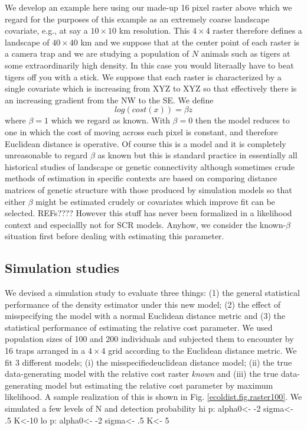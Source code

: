 We develop an example here using our made-up 16 pixel raster above which 
we regard for the purposes of this example as an extremely coarse landscape 
covariate, e.g., at say a $10 \times 10$ km resolution. This $4 \times  4$ raster therefore 
defines a landscape of $40 \times 40$ km and we suppose that at the center point 
of each raster is a camera trap and we are studying a population of $N$ 
animals such as tigers at some extraordinarily high density. In this case you
would literaally have to beat tigers off you with a stick. We suppose 
that each raster is characterized by a single covariate which is increasing 
from XYZ to XYZ so that effectively there is an increasing gradient from the 
NW to the SE. We define 
\[
 log(cost(x))=  \beta z 
 \]
where $\beta = 1$ which we regard as known. With $\beta=0$ then the model reduces to
one in which the cost of moving across each pixel is constant, and therefore Euclidean
distance is operative.
 Of course this is a model and it is completely
unreasonable to regard $\beta$ as known but this is standard practice in essentially all
historical studies of landscape or genetic connectivity although sometimes crude methods
of estimation in specific contexts are based on comparing distance matrices of genetic
structure with those produced by simulation models so that either $\beta$ might be estimated
crudely or covariates which improve fit can be selected. REFs????
However this stuff has never been formalized in a likelihood context and especiallly
not for SCR models. 
Anyhow, we consider the known-$\beta$ situation first before dealing with estimating
this parameter. 


\subsection{Simulation studies}

We devised a simulation study to evaluate three things: (1) the general statistical performance
of the density estimator under this new model; (2) the effect of misspecifying the model with
a normal Euclidean distance metric and (3) the statistical performance of estimating the relative
cost parameter.
We used population sizes of 100 and 200 individuals and subjected them to encounter by 16 traps
arranged in a $4\times 4$ grid according to the Euclidean distance metric. We fit 3 different 
models; (i) the misspecifiedeuclidean distance model; (ii) the true data-generating model with
the relative cost raster {\it known} and (iii) the true data-generating model but estimating
the relative cost parameter by maximum likelihood. 
A sample realization of this is shown in Fig. 
\ref{ecoldist.fig.raster100}.
We simulated a few levels of N and detection probability 
hi p: alpha0<- -2     sigma<- .5    K<-10
lo p: alpha0<- -2     sigma<- .5    K<- 5


